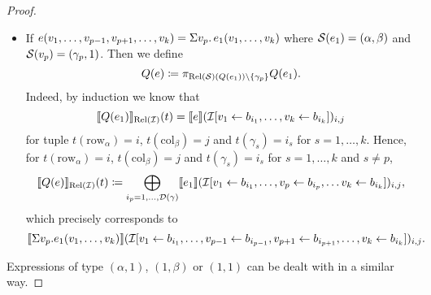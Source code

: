 \begin{proof}
\begin{itemize}
  \item If $e(v_1,\ldots,v_{p-1},v_{p+1},\ldots,v_k)=\Sigma v_p. \, e_1(v_1,\ldots,v_k)$ where $\mathcal{S}(e_1)=(\alpha,\beta)$ and $\mathcal{S}(v_p)=(\gamma_p,1)$. Then we define
  $$
  Q (e)\coloneqq \pi_{\text{Rel}(\mathcal{S})(Q(e_1))\setminus\{\gamma_p\}} Q (e_1).
  $$
 Indeed, by induction we know that 
 $$
\llbracket Q(e_1) \rrbracket_{\text{Rel}(\mathcal{I})}(t)=\llbracket e \rrbracket(\mathcal{I}[v_1\gets b_{i_1},\ldots,v_k\gets b_{i_k}])_{i,j}
$$
for tuple $t(\mathrm{row}_\alpha)=i$, $t(\mathrm{col}_\beta)=j$ and $t(\gamma_s)=i_s$ for $s=1,\ldots, k$.
Hence, for $t(\mathrm{row}_\alpha)=i$, $t(\mathrm{col}_\beta)=j$ and $t(\gamma_s)=i_s$ for $s=1,\ldots, k$ and $s\neq p$,
$$
\llbracket Q(e) \rrbracket_{\text{Rel}(\mathcal{I})}(t)\coloneqq \bigoplus_{i_p=1,\ldots,\mathcal{D}(\gamma)} \llbracket e_1 \rrbracket(\mathcal{I}[v_1\gets b_{i_1},\ldots,v_{p}\gets b_{i_p},\ldots v_k\gets b_{i_k}])_{i,j},$$
which precisely corresponds to 
$$
\llbracket \Sigma v_p. e_1(v_1,\ldots,v_k) \rrbracket(\mathcal{I}[v_1\gets b_{i_1},\ldots,v_{p-1}\gets b_{i_{p-1}},v_{p+1}\gets b_{i_{p+1}},\ldots,v_k\gets b_{i_k}])_{i,j}.
$$

\end{itemize}
Expressions of type $(\alpha,1)$, $(1,\beta)$ or $(1,1)$  can be dealt with in a similar way.
\end{proof}
